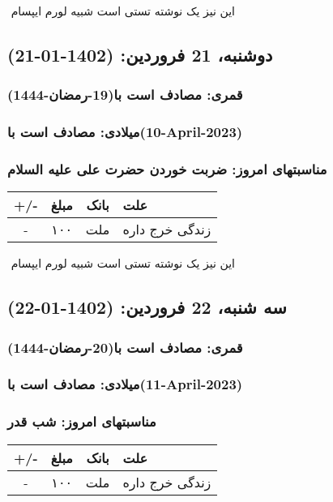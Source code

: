 \documentclass{article}
\newcommand{\rnote}[1]{\marginpar{\textcolor{color}{\StrSubstitute{\##1}{ }{\_}}}}
\newcommand{\myRow}[4]{
    #1 & #2 & #3 & #4 \\ \hline
}
\begin{document}
‌
\rnote{تست}
این نیز یک نوشته تستی است شبیه لورم ایپسام




\newpage
{}
\textcolor{color}{
\section{ دوشنبه، 21 فروردین: (1402-01-21) }
\subsubsection*{قمری: مصادف است با(19-رمضان-1444)} 
\subsubsection*{میلادی: مصادف است با(10-April-2023)}
\subsubsection*{مناسبتهای امروز: ضربت خوردن حضرت علی علیه السلام}
}


\begin{tabular}{ | c | c | c | p{5cm} |}
    \hline
    \myRow{ +/- }{مبلغ}{بانک}{علت}
    \myRow{-}{۱۰۰}{ملت}{زندگی خرج داره}
\end{tabular}
\newline
\newline

‌
\rnote{تست}
این نیز یک نوشته تستی است شبیه لورم ایپسام




\newpage
{}
\textcolor{color}{
\section{ سه شنبه، 22 فروردین: (1402-01-22) }
\subsubsection*{قمری: مصادف است با(20-رمضان-1444)} 
\subsubsection*{میلادی: مصادف است با(11-April-2023)}
\subsubsection*{مناسبتهای امروز: شب قدر}
}


\begin{tabular}{ | c | c | c | p{5cm} |}
    \hline
    \myRow{ +/- }{مبلغ}{بانک}{علت}
    \myRow{-}{۱۰۰}{ملت}{زندگی خرج داره}
\end{tabular}
\newline
\newline
\end{document}
